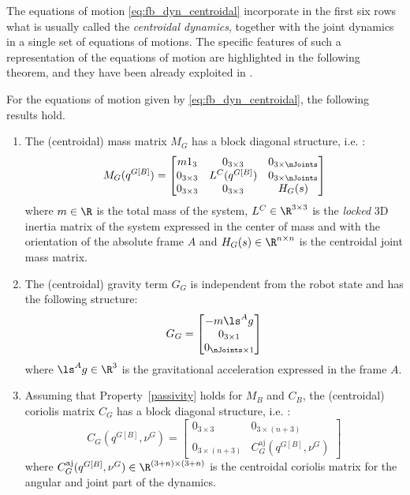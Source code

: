 The equations of motion \eqref{eq:fb_dyn_centroidal} incorporate in the first six rows what is usually called the \emph{centroidal dynamics}, together with the joint dynamics in a single set of equations of motions. 
The specific features of such a representation of the equations of motion are highlighted in the following theorem, and they have been already exploited in \citep{nava2016}. 
\begin{lemma}
\label{lem:centroidalDynamics}
For the equations of motion given by \eqref{eq:fb_dyn_centroidal}, the following results hold.
\begin{enumerate}
\item The (centroidal) mass matrix $M_G$ has a block 
diagonal structure, i.e. :
\begin{equation}
\label{eq:centroidalMassMatrix}
M_G(q^{G[B]}) = 
\begin{bmatrix}
m 1_{3} & 0_{3\times3} & 0_{3\times \nJoints} \\
0_{3\times3} & L^C(q^{G[B]}) & 0_{3\times \nJoints} \\
0_{3\times3} & 0_{3\times3} & H_G(s)
\end{bmatrix} 
\end{equation}
where $m \in \R$ is the total mass of the system, $L^C \in \R^{3 \times 3}$ is the \emph{locked} 3D inertia matrix of the system expressed in the center of mass and with the orientation of the absolute frame $A$ and $H_G(s) \in \R^{n \times n}$ is the centroidal joint mass matrix.

\item The (centroidal) gravity term $G_G$ is independent from the robot state and has the following structure: 
\begin{equation}
G_G = 
\begin{bmatrix}
-m \ls^Ag \\
0_{3\times1} \\
0_{\nJoints\times1}
\end{bmatrix}
\end{equation}
where $\ls^Ag \in \R^3$ is the gravitational acceleration expressed in the frame $A$.

\item Assuming that Property~\ref{passivity} holds for $M_B$ and $C_B$, the (centroidal) coriolis matrix $C_G$ has a block diagonal structure, i.e. :
\begin{equation}
C_G(q^{G[B]},\nu^G) = 
\begin{bmatrix}
0_{3\times3} & 0_{3 \times (n+3)} \\
0_{3 \times (n+3)} & C^{\text{aj}}_G(q^{G[B]},\nu^G) 
\end{bmatrix}
\end{equation}
where $C^{\text{aj}}_G(q^{G[B]},\nu^G) \in \R^{(3+n)\times(3+n)}$ is the centroidal coriolis matrix for the angular and joint part of the dynamics.
\end{enumerate}
\end{lemma}

